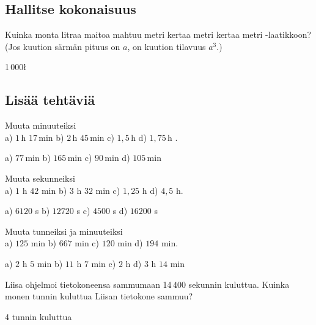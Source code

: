 \begin{tehtavasivu}
\subsection*{Hallitse kokonaisuus}

\begin{tehtava}
Kuinka monta litraa maitoa mahtuu metri kertaa metri kertaa metri -laatikkoon? (Jos kuution särmän pituus on $a$, on kuution tilavuus $a^3$.)
	\begin{vastaus}
	1\,000\l
	\end{vastaus}
\end{tehtava}

\subsection*{Lisää tehtäviä}


\begin{tehtava}
Muuta minuuteiksi \\
a) $1$\,h $17$\,min \qquad
b) $2$\,h $45$\,min \qquad
c) $1,5$\,h \qquad
d) $1,75$\,h .
\begin{vastaus}
a) $77$\,min \qquad
b) $165$\,min \qquad
c) $90$\,min \qquad
d) $105$\,min
\end{vastaus}
\end{tehtava}

\begin{tehtava}
Muuta sekunneiksi \\
a) $1$ h $42$ min \qquad
b) $3$ h $32$ min \qquad
c) $1,25$ h \qquad
d) $4,5$ h.
\begin{vastaus}
a) $6120$ s \qquad
b) $12720$ s \qquad
c) $4500$ s \qquad
d) $16200$ s
\end{vastaus}
\end{tehtava}

\begin{tehtava}
Muuta tunneiksi ja minuuteiksi \\
a) $125$ min \qquad
b) $667$ min \qquad
c) $120$ min \qquad
d) $194$ min.
\begin{vastaus}
a) $2$ h $5$ min \qquad
b) $11$ h $7$ min \qquad
c) $2$ h \qquad
d) $3$ h $14$ min
\end{vastaus}
\end{tehtava}

\begin{tehtava}
Liisa ohjelmoi tietokoneensa sammumaan 14\,400 sekunnin kuluttua. Kuinka monen tunnin kuluttua Liisan tietokone sammuu?
\begin{vastaus}
4 tunnin kuluttua
\end{vastaus}
\end{tehtava}


\end{tehtavasivu}
